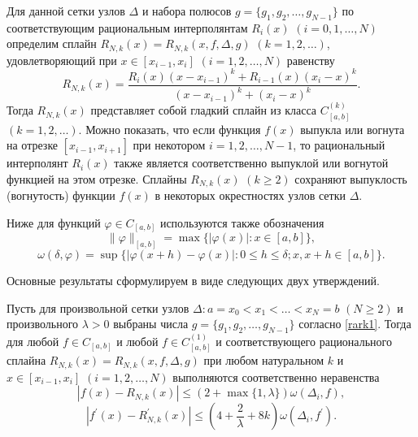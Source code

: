Для данной сетки узлов $\Delta$ и набора полюсов $g=\{g_1,g_2,\dots,g_{N-1}\}$ по соответствующим рациональным интерполянтам
$R_i(x)$ $(i=0,1,\dots,N)$ определим сплайн $R_{N,k}(x)=R_{N,k} (x, f, \Delta,g)$ $(k=1,2,\dots)$, удовлетворяющий при
$x\in [x_{i-1}, x_i]$ $(i=1,2,\dots,N)$ равенству
\begin{equation}\label{rark3}
R_{N,k}(x)=\frac{R_i(x)(x-x_{i-1})^k+R_{i-1}(x)(x_i-x)^k}{(x-x_{i-1})^k+(x_i-x)^k}.
\end{equation}
Тогда $R_{N,k} (x)$ представляет собой гладкий сплайн из класса $C_{[a,b]}^{(k)}$ $(k=1,2,\dots)$.
Можно показать, что если функция $f(x)$  выпукла или вогнута на отрезке $[x_{i-1}, x_{i+1}]$ при некотором $i=1,2,\dots,N-1$,
то рациональный интерполянт $R_i(x)$ также является соответственно выпуклой или вогнутой функцией на этом отрезке.
Сплайны $R_{N,k}(x)$  $(k\geqslant 2)$ сохраняют выпуклость (вогнутость) функции $f(x)$ в некоторых окрестностях узлов сетки $\Delta$.

Ниже для функций $\varphi\in C_{[a,b]}$ используются также обозначения
$$
\|\varphi\|_{[a,b]}=\max\{|\varphi (x)|: x\in [a,b]\},
$$
$$
\omega (\delta, \varphi)=\sup \{|\varphi(x+h)-\varphi(x)|: 0\leqslant h\leqslant \delta; x,x+h\in [a,b]\}.
$$

Основные результаты сформулируем в виде следующих двух утверждений.

\begin{theorem}\label{rarkteor1}
Пусть для произвольной сетки узлов $\Delta: a=x_0<x_1<\dots<x_N=b$ $(N\geqslant 2)$ и произвольного $\lambda>0$
выбраны числа  $g=\{g_1,g_2,\dots,g_{N-1}\}$ согласно \eqref{rark1}.
Тогда для любой $f\in C_{[a,b]}$ и любой $f\in C_{[a,b]}^{(1)}$ и соответствующего рационального сплайна
$R_{N,k}(x)=R_{N,k}(x,f,\Delta, g)$ при любом натуральном $k$ и $x\in[x_{i-1}, x_i]$ $(i=1,2,\dots,N)$
выполняются соответственно неравенства
\begin{equation}\label{rark4}
|f(x)-R_{N,k}(x)|\leqslant (2+\max\{1, \lambda\})\omega(\Delta_i, f),
\end{equation}
\begin{equation}\label{rark5}
|f^\prime(x)-R^\prime_{N,k}(x)|\leqslant \left(4+\frac 2\lambda+8k\right)\omega(\Delta_i, f^\prime).
\end{equation}
 \end{theorem}

